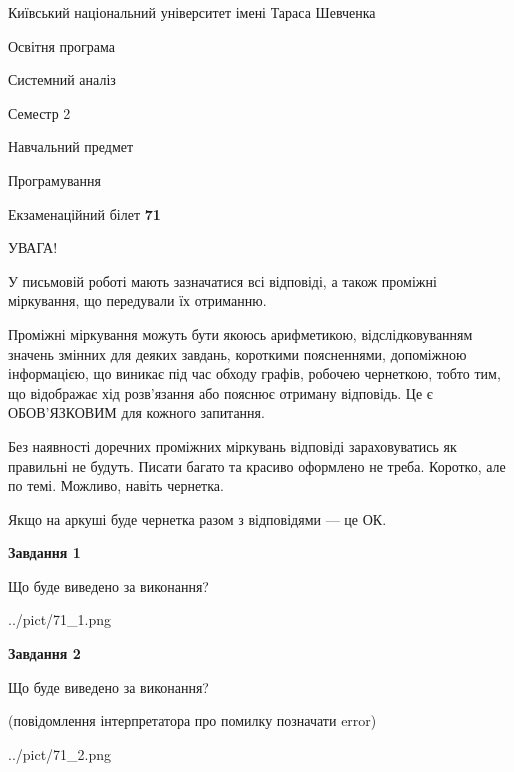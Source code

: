 \documentclass[12pt, ukrainian]{article}
\begin{document}
{{\begin {small}\par
{ \center  Київський національний університет імені Тараса Шевченка \par}
{\parbox {5 cm}{Освітня програма \hfill}{\parbox {7 cm}{Системний аналіз \hfill}}\parbox {6 cm}{\hfill Семестр 2}}\par
{\parbox {5 cm} {Навчальний предмет \hfill}\parbox {7 cm}{Програмування \hfill}\parbox {6cm}{\hfill}\par}\vspace{-7pt} \end{small}}{\center Екзаменаційний білет \No \textbf
{ 71 }\par}}
{
\begin {large}
УВАГА!

У письмовій роботі мають зазначатися всі відповіді, а також проміжні міркування, що передували їх отриманню.

Проміжні міркування можуть бути якоюсь арифметикою, відслідковуванням зна\-чень змінних для деяких завдань,
короткими поясненнями, допоміжною інформацією, що виникає під час обходу графів, робочею чернеткою,
тобто тим, що відображає хід розв’язання або пояснює отриману відповідь.
Це є ОБОВ’ЯЗКОВИМ для кожного запитання.

Без наявності доречних проміжних міркувань відповіді зараховуватись як правиль\-ні не будуть.
Писати багато та красиво оформлено не треба. Коротко, але по темі. Можли\-во, навіть чернетка.

Якщо на аркуші буде чернетка разом з відповідями --- це ОК.

\newpage

{\begin {center}\textbf{Завдання 1}\end {center}}\par
Що буде виведено за виконання?\par
\begin{center}
	{../pict/71_1.png}
\end{center}
\newpage

{\begin {center}\textbf{Завдання 2}\end {center}}\par
Що буде виведено за виконання?\par
 (повідомлення інтерпретатора про помилку позначати error)\par
\begin{center}
	{../pict/71_2.png}
\end{center}
\newpage


\end{large}}
\end{document}
